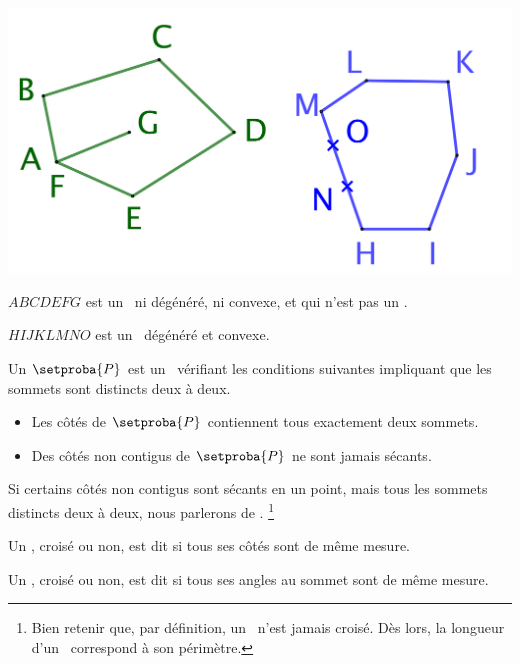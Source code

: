 \begin{center}
	\small\itshape\centering
	\includegraphics[scale=.35]{content/polygon/def/degenerated-ncycles.png}
	
	\smallskip
	$ABCDEFG$ est un \ncycle\ ni dégénéré, ni convexe, et qui n'est pas un \ngone.
	
	\smallskip
	$HIJKLMNO$ est un \ncycle\ dégénéré et convexe.
\end{center}




\newpage

\begin{defi}
	Un \onedef{\ngone} $\setproba{P}$ est un \ncycle\ vérifiant les conditions suivantes impliquant que les sommets sont distincts deux à deux.
	\begin{itemize}
		\item Les côtés de $\setproba{P}$ contiennent tous exactement deux sommets.

		\item Des côtés non contigus de $\setproba{P}$ ne sont jamais sécants.
	\end{itemize}


	Si certains côtés non contigus sont sécants en un point, mais tous les sommets distincts deux à deux, nous parlerons de .%
	\footnote{
		Bien retenir que, par définition, un \ngone\ n'est jamais croisé.
		Dès lors, la longueur d'un \ngone\ correspond à son périmètre.
	}
\end{defi}


\begin{defi}
	Un \ngone, croisé ou non, est dit  si tous ses côtés sont de même mesure.
\end{defi}


\begin{defi}
	Un \ngone, croisé ou non, est dit  si tous ses angles au sommet sont de même mesure.
\end{defi}



